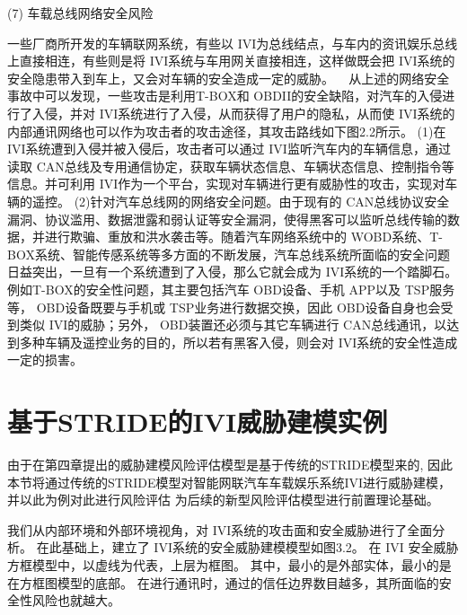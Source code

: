 (7) 车载总线网络安全风险 

一些厂商所开发的车辆联网系统，有些以 IVI为总线结点，与车内的资讯娱乐总线上直接相连，有些则是将 IVI系统与车用网关直接相连，这样做既会把 IVI系统的安全隐患带入到车上，又会对车辆的安全造成一定的威胁。
 
从上述的网络安全事故中可以发现，一些攻击是利用T-BOX和 OBDII的安全缺陷，对汽车的入侵进行了入侵，并对 IVI系统进行了入侵，从而获得了用户的隐私，从而使 IVI系统的内部通讯网络也可以作为攻击者的攻击途径，其攻击路线如下图2.2所示。
(1)在 IVI系统遭到入侵并被入侵后，攻击者可以通过 IVI监听汽车内的车辆信息，通过读取 CAN总线及专用通信协定，获取车辆状态信息、车辆状态信息、控制指令等信息。并可利用 IVI作为一个平台，实现对车辆进行更有威胁性的攻击，实现对车辆的遥控。
(2)针对汽车总线网的网络安全问题。由于现有的 CAN总线协议安全漏洞、协议滥用、数据泄露和弱认证等安全漏洞，使得黑客可以监听总线传输的数据，并进行欺骗、重放和洪水袭击等。随着汽车网络系统中的 WOBD系统、T-BOX系统、智能传感系统等多方面的不断发展，汽车总线系统所面临的安全问题日益突出，一旦有一个系统遭到了入侵，那么它就会成为 IVI系统的一个踏脚石。例如T-BOX的安全性问题，其主要包括汽车 OBD设备、手机 APP以及 TSP服务等， OBD设备既要与手机或 TSP业务进行数据交换，因此 OBD设备自身也会受到类似 IVI的威胁；另外， OBD装置还必须与其它车辆进行 CAN总线通讯，以达到多种车辆及遥控业务的目的，所以若有黑客入侵，则会对 IVI系统的安全性造成一定的损害。

\section{基于STRIDE的IVI威胁建模实例}
由于在第四章提出的威胁建模风险评估模型是基于传统的STRIDE模型来的, 因此本节将通过传统的STRIDE模型对智能网联汽车车载娱乐系统IVI进行威胁建模，并以此为例对此进行风险评估
为后续的新型风险评估模型进行前置理论基础。

我们从内部环境和外部环境视角，对 IVI系统的攻击面和安全威胁进行了全面分析。
在此基础上，建立了 IVI系统的安全威胁建模模型如图3.2。
在 IVI 安全威胁方框模型中，以虚线为代表，上层为框图。
其中，最小的是外部实体，最小的是在方框图模型的底部。
在进行通讯时，通过的信任边界数目越多，其所面临的安全性风险也就越大。

